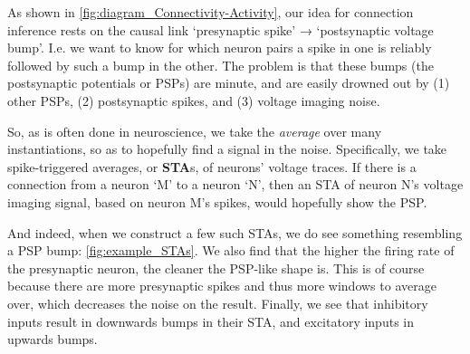 



As shown in \cref{fig:diagram_Connectivity-Activity}, our idea for connection inference rests on the causal link `presynaptic spike' → `postsynaptic voltage bump'. I.e. we want to know for which neuron pairs a spike in one is reliably followed by such a bump in the other. The problem is that these bumps (the postsynaptic potentials or PSPs) are minute, and are easily drowned out by (1) other PSPs, (2) postsynaptic spikes, and (3) voltage imaging noise.

So, as is often done in neuroscience, we take the \emph{average} over many instantiations, so as to hopefully find a signal in the noise. Specifically, we take spike-triggered averages, or \textbf{STA}s, of neurons' voltage traces. If there is a connection from a neuron `M' to a neuron `N', then an STA of neuron N's voltage imaging signal, based on neuron M's spikes, would hopefully show the PSP.

And indeed, when we construct a few such STAs, we do see something resembling a PSP bump: \cref{fig:example_STAs}. We also find that the higher the firing rate of the presynaptic neuron, the cleaner the PSP-like shape is. This is of course because there are more presynaptic spikes and thus more windows to average over, which decreases the noise on the result. Finally, we see that inhibitory inputs result in downwards bumps in their STA, and excitatory inputs in upwards bumps.

